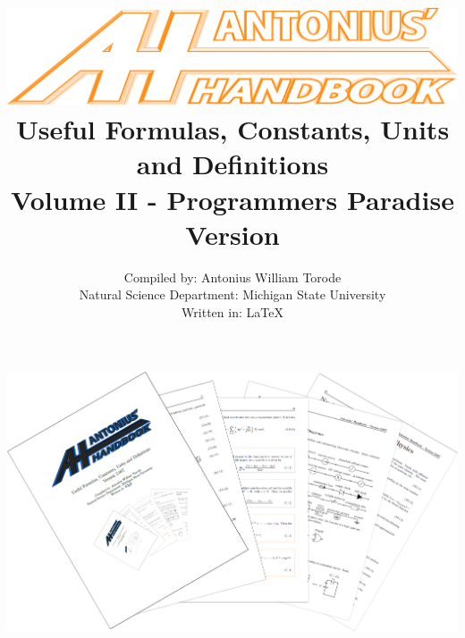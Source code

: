\documentclass[openany,twoside, notitlepage,letterpaper,11pt]{book}
\title{\includegraphics[scale=.22]{./Images/Covers/AH3.png}
	\\ \vspace{1.5cm} Useful Formulas, Constants, Units and Definitions \\ Volume II - Programmers Paradise \\ Version \Version}
\date{}
\author{Compiled by: Antonius William Torode\\ Natural Science Department: Michigan State University \\ Written in: \LaTeX}
\begin{document}
\frontmatter
\maketitle
\thispagestyle{empty}
\pagestyle{empty}
\begin{center}
	\includegraphics[scale=1.8]{./Images/Covers/background_tunnel.png}
\end{center}





\thispagestyle{empty}

\tableofcontents


\setlength{\parindent}{0pt}
\mainmatter
\pagestyle{fancy}


\newpage


\newpage


\newpage


%

\newpage


\newpage


\newpage


%

%

\newpage


%

%

%

\newpage




\backmatter

\printindex
\end{document}
